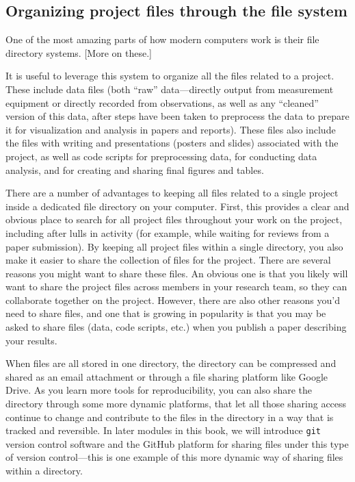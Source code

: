 \documentclass[]{tufte-book}
\begin{document}
\hypertarget{organizing-project-files-through-the-file-system}{%
\subsection{Organizing project files through the file system}\label{organizing-project-files-through-the-file-system}}

One of the most amazing parts of how modern computers work is their file
directory systems. {[}More on these.{]}

It is useful to leverage this system to organize all the files related to a
project. These include data files (both ``raw'' data---directly output from
measurement equipment or directly recorded from observations, as well as any
``cleaned'' version of this data, after steps have been taken to preprocess the
data to prepare it for visualization and analysis in papers and reports). These
files also include the files with writing and presentations (posters and slides)
associated with the project, as well as code scripts for preprocessing data,
for conducting data analysis, and for creating and sharing final figures and
tables.

There are a number of advantages to keeping all files related to a single project
inside a dedicated file directory on your computer. First, this provides a clear
and obvious place to search for all project files throughout your work on the
project, including after lulls in activity (for example, while waiting for
reviews from a paper submission). By keeping all project files within a single
directory, you also make it easier to share the collection of files for the
project. There are several reasons you might want to share these files. An
obvious one is that you likely will want to share the project files across members
in your research team, so they can collaborate together on the project. However,
there are also other reasons you'd need to share files, and one that is growing
in popularity is that you may be asked to share files (data, code scripts, etc.)
when you publish a paper describing your results.

When files are all stored in one directory, the directory can be compressed and
shared as an email attachment or through a file sharing platform like Google Drive.
As you learn more tools for reproducibility, you can also share the directory through
some more dynamic platforms, that let all those sharing access continue to change
and contribute to the files in the directory in a way that is tracked and
reversible. In later modules in this book, we will introduce \texttt{git} version control
software and the GitHub platform for sharing files under this type of version
control---this is one example of this more dynamic way of sharing files within
a directory.
\end{document}
